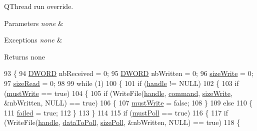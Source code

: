 Q\-Thread run override. 


\begin{DoxyParams}{Parameters}
{\em none} & \\
\hline
\end{DoxyParams}

\begin{DoxyExceptions}{Exceptions}
{\em none} & \\
\hline
\end{DoxyExceptions}
\begin{DoxyReturn}{Returns}
none 
\end{DoxyReturn}

\begin{DoxyCode}
93 \{
94     \hyperlink{a00003_a50e15ae51c87ae06ab29c8148cb5f36c}{DWORD} nbReceived = 0;
95     \hyperlink{a00003_a50e15ae51c87ae06ab29c8148cb5f36c}{DWORD} nbWritten = 0;
96     \hyperlink{a00002_ad1e1c4a0c8bb235b5e26ec9c5d1c3f0d}{sizeWrite} = 0;
97     \hyperlink{a00002_ad9f5381795006f1f187538296368cd11}{sizeRead} = 0;
98 
99     \textcolor{keywordflow}{while} (1)
100     \{
101         \textcolor{keywordflow}{if} (\hyperlink{a00002_a07ff1fa563f3d58110ce80c3c1796f9b}{handle} != NULL)
102         \{
103             \textcolor{keywordflow}{if} (\hyperlink{a00002_a951ec1a18196d806edaf6d3fb517a239}{mustWrite} == \textcolor{keyword}{true})
104             \{
105                 \textcolor{keywordflow}{if} (WriteFile(\hyperlink{a00002_a07ff1fa563f3d58110ce80c3c1796f9b}{handle}, \hyperlink{a00002_a8e3c3dbe1da8cc4b648ab2a6d7ddb7c5}{command}, \hyperlink{a00002_ad1e1c4a0c8bb235b5e26ec9c5d1c3f0d}{sizeWrite}, &nbWritten, NULL) == \textcolor{keyword}{true})
106                 \{
107                                         \hyperlink{a00002_a951ec1a18196d806edaf6d3fb517a239}{mustWrite} = \textcolor{keyword}{false};
108                 \}
109                 \textcolor{keywordflow}{else}
110                 \{
111                                         \hyperlink{a00002_a53794d9466be19cb9c0b65f87090e237}{failed} = \textcolor{keyword}{true};
112                 \}
113             \}
114 
115             \textcolor{keywordflow}{if} (\hyperlink{a00002_a21713484042dd9404528d9cec57ebe87}{mustPoll} == \textcolor{keyword}{true})
116             \{
117                 \textcolor{keywordflow}{if} (WriteFile(\hyperlink{a00002_a07ff1fa563f3d58110ce80c3c1796f9b}{handle}, \hyperlink{a00002_a581ac8ca710cda078fd8ddb8e50954eb}{dataToPoll}, \hyperlink{a00002_a608be86b18e15c3309a1b50794a2115c}{sizePoll}, &nbWritten, NULL) == \textcolor{keyword}{
      true})
118                 \{

\end{DoxyCode}
